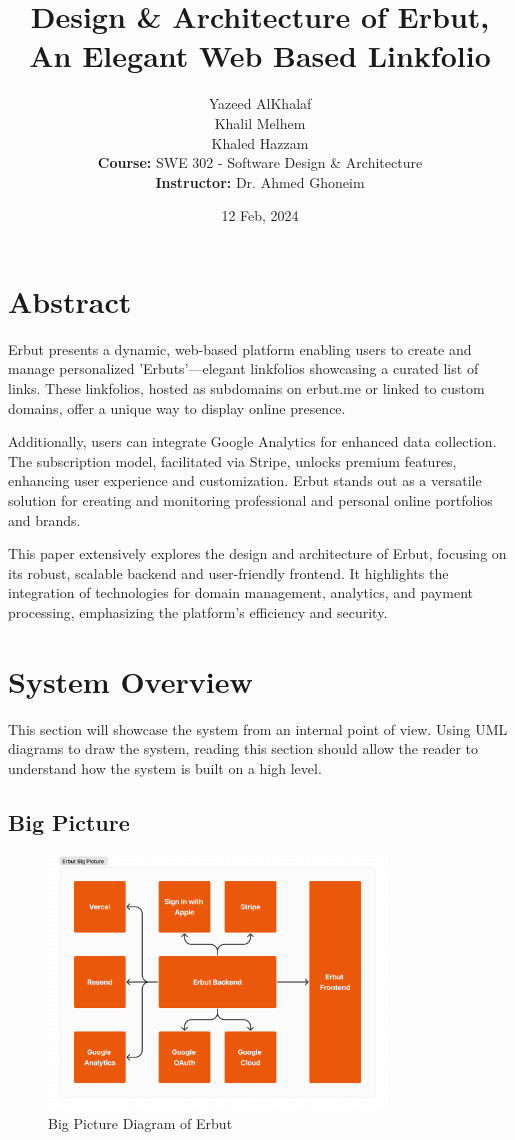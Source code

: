 \documentclass{article}
\title{Design \& Architecture of Erbut, An Elegant Web Based Linkfolio}
\author{
    Yazeed AlKhalaf \\
    Khalil Melhem \\
    Khaled Hazzam \\
    \textbf{Course:} SWE 302 - Software Design \& Architecture \\
    \textbf{Instructor:} Dr. Ahmed Ghoneim
}
\date{12 Feb, 2024}
\begin{document}
\maketitle

\newpage

\section*{Abstract}

Erbut presents a dynamic, web-based platform enabling users to create and manage personalized 'Erbuts'—elegant linkfolios showcasing a curated list of links. These linkfolios, hosted as subdomains on erbut.me or linked to custom domains, offer a unique way to display online presence.

Additionally, users can integrate Google Analytics for enhanced data collection. The subscription model, facilitated via Stripe, unlocks premium features, enhancing user experience and customization. Erbut stands out as a versatile solution for creating and monitoring professional and personal online portfolios and brands.

This paper extensively explores the design and architecture of Erbut, focusing on its robust, scalable backend and user-friendly frontend. It highlights the integration of technologies for domain management, analytics, and payment processing, emphasizing the platform's efficiency and security.

\newpage

\section{System Overview}

This section will showcase the system from an internal point of view. Using UML diagrams to draw the system, reading this section should allow the reader to understand how the system is built on a high level.

\subsection{Big Picture}

\begin{figure}[h!]
\centering
\includegraphics[width=0.8\textwidth]{images/erbut-big-picture.png}
\caption{Big Picture Diagram of Erbut}
\label{fig:bigpicture}
\end{figure}
\end{document}
